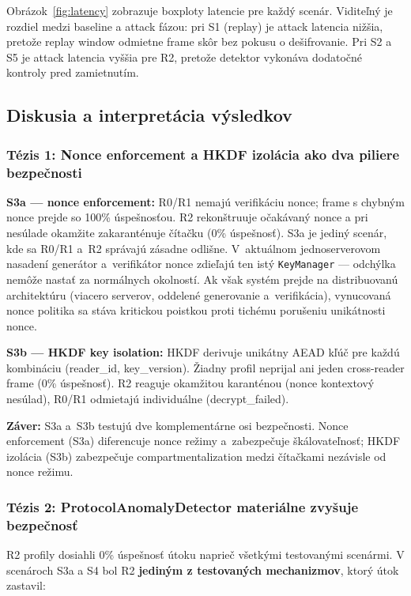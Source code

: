 \noindent Obrázok~\ref{fig:latency} zobrazuje boxploty latencie pre každý scenár. Viditeľný je rozdiel medzi baseline a attack fázou: pri S1 (replay) je attack latencia nižšia, pretože replay window odmietne frame skôr bez pokusu o dešifrovanie. Pri S2 a S5 je attack latencia vyššia pre R2, pretože detektor vykonáva dodatočné kontroly pred zamietnutím.

\subsection{Diskusia a interpretácia výsledkov}
\label{sec:discussion}

\subsubsection{Tézis 1: Nonce enforcement a HKDF izolácia ako dva piliere bezpečnosti}

\textbf{S3a --- nonce enforcement:} R0/R1 nemajú verifikáciu nonce; frame s chybným nonce prejde so 100\% úspešnosťou. R2 rekonštruuje očakávaný nonce a pri nesúlade okamžite zakaranténuje čítačku (0\% úspešnosť). S3a je jediný scenár, kde sa R0/R1 a~R2 správajú zásadne odlišne. V~aktuálnom jednoserverovom nasadení generátor a~verifikátor nonce zdieľajú ten istý \texttt{KeyManager} --- odchýlka nemôže nastať za normálnych okolností. Ak však systém prejde na distribuovanú architektúru (viacero serverov, oddelené generovanie a~verifikácia), vynucovaná nonce politika sa stáva kritickou poistkou proti tichému porušeniu unikátnosti nonce\cite{RogawayNonceMisuse2004}.

\textbf{S3b --- HKDF key isolation:} HKDF\cite{RFC5869} derivuje unikátny AEAD kľúč pre každú kombináciu (reader\_id, key\_version). Žiadny profil neprijal ani jeden cross-reader frame (0\% úspešnosť). R2 reaguje okamžitou karanténou (nonce kontextový nesúlad), R0/R1 odmietajú individuálne (decrypt\_failed).

\textbf{Záver:} S3a a~S3b testujú dve komplementárne osi bezpečnosti. Nonce enforcement (S3a) diferencuje nonce režimy a~zabezpečuje škálovateľnosť; HKDF izolácia (S3b) zabezpečuje compartmentalization medzi čítačkami nezávisle od nonce režimu.

\subsubsection{Tézis 2: ProtocolAnomalyDetector materiálne zvyšuje bezpečnosť}

R2 profily dosiahli 0\% úspešnosť útoku naprieč všetkými testovanými scenármi. V scenároch S3a a S4 bol R2 \textbf{jediným z testovaných mechanizmov}, ktorý útok zastavil:

